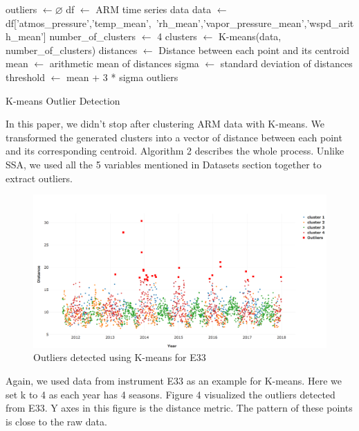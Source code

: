 \documentclass[letterpaper, 10 pt, conference]{ieeeconf}  %
\begin{document}
\begin{algorithm}[ht]
\DontPrintSemicolon
\SetAlgoLined
\BlankLine

outliers $\leftarrow \varnothing$\;
df $\leftarrow$ ARM time series data\;
data $\leftarrow$ df['atmos\_pressure','temp\_mean',\
'rh\_mean','vapor\_pressure\_mean','wspd\_arith\_mean']\;
number\_of\_clusters $\leftarrow$ 4\;
clusters $\leftarrow$ K-means(data, number\_of\_clusters)\;
distances $\leftarrow$ Distance between each point and its centroid\;
mean $\leftarrow$ arithmetic mean of distances\;
sigma $\leftarrow$ standard deviation of distances\;
threshold $\leftarrow$ mean + 3 * sigma\;
\Return outliers
\caption{K-means Outlier Detection}
\end{algorithm}

In this paper, we didn't stop after clustering ARM data with K-means. We transformed the generated clusters into a vector of distance between each point and its corresponding centroid. Algorithm 2 describes the whole process. Unlike SSA, we used all the 5 variables mentioned in Datasets section together to extract outliers.

\begin{figure}[ht]
    \centering
    \includegraphics[width=\textwidth]{kmeans.png}
    \caption{Outliers detected using K-means for E33}
    \label{fig:kmeans}
\end{figure}

Again, we used data from instrument E33 as an example for K-means. Here we set k to 4 as each year has 4 seasons.  Figure 4 visualized the outliers detected from E33. Y axes in this figure is the distance metric. The pattern of these points is close to the raw data.
\end{document}
